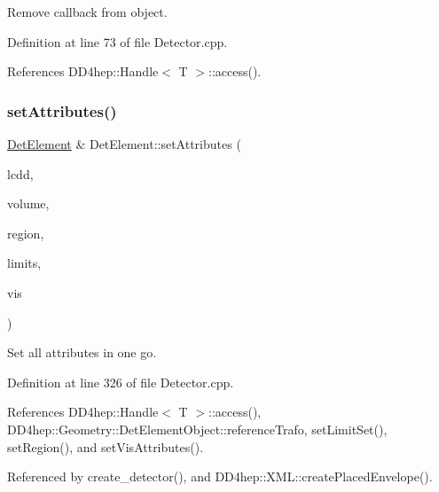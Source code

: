 Remove callback from object. 



Definition at line 73 of file Detector.\+cpp.



References D\+D4hep\+::\+Handle$<$ T $>$\+::access().

\hypertarget{class_d_d4hep_1_1_geometry_1_1_det_element_a42520475d452cb0af9d6541cfe440a4a}{}\label{class_d_d4hep_1_1_geometry_1_1_det_element_a42520475d452cb0af9d6541cfe440a4a} 
\subsubsection{\texorpdfstring{set\+Attributes()}{setAttributes()}}
{\footnotesize\ttfamily \hyperlink{class_d_d4hep_1_1_geometry_1_1_det_element}{Det\+Element} \& Det\+Element\+::set\+Attributes (\begin{DoxyParamCaption}\item[{const \hyperlink{class_d_d4hep_1_1_geometry_1_1_l_c_d_d}{L\+C\+DD} \&}]{lcdd,  }\item[{const \hyperlink{class_d_d4hep_1_1_geometry_1_1_volume}{Volume} \&}]{volume,  }\item[{const std\+::string \&}]{region,  }\item[{const std\+::string \&}]{limits,  }\item[{const std\+::string \&}]{vis }\end{DoxyParamCaption})}



Set all attributes in one go. 



Definition at line 326 of file Detector.\+cpp.



References D\+D4hep\+::\+Handle$<$ T $>$\+::access(), D\+D4hep\+::\+Geometry\+::\+Det\+Element\+Object\+::reference\+Trafo, set\+Limit\+Set(), set\+Region(), and set\+Vis\+Attributes().



Referenced by create\+\_\+detector(), and D\+D4hep\+::\+X\+M\+L\+::create\+Placed\+Envelope().

\hypertarget{class_d_d4hep_1_1_geometry_1_1_det_element_a3b5dbbb87e8e1ddb64fc94e98cd5a70b}{}\label{class_d_d4hep_1_1_geometry_1_1_det_element_a3b5dbbb87e8e1ddb64fc94e98cd5a70b} 
